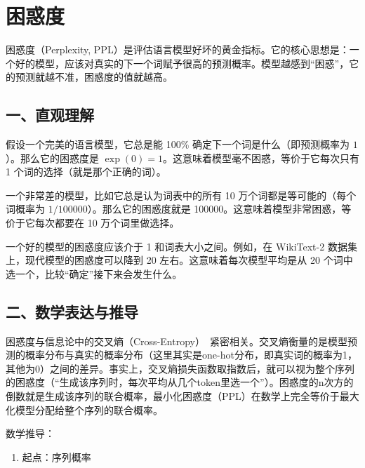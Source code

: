 \setcounter{section}{7}

\hypertarget{ux56f0ux60d1ux5ea6}{%
\section{困惑度}\label{ux56f0ux60d1ux5ea6}}

困惑度（Perplexity, PPL）是评估语言模型好坏的黄金指标。它的核心思想是：一个好的模型，应该对真实的下一个词赋予很高的预测概率。模型越感到``困惑''，它的预测就越不准，困惑度的值就越高。

\hypertarget{ux4e00ux76f4ux89c2ux7406ux89e3}{%
\subsection{一、直观理解}\label{ux4e00ux76f4ux89c2ux7406ux89e3}}

假设一个完美的语言模型，它总是能 100\% 确定下一个词是什么（即预测概率为 \(1\)）。那么它的困惑度是 \(\exp(0)=1\)。这意味着模型毫不困惑，等价于它每次只有 1 个词的选择（就是那个正确的词）。

一个非常差的模型，比如它总是认为词表中的所有 10 万个词都是等可能的（每个词概率为 \(1/100000\)）。那么它的困惑度就是 100000。这意味着模型非常困惑，等价于它每次都要在 10 万个词里做选择。

一个好的模型的困惑度应该介于 1 和词表大小之间。例如，在 WikiText-2 数据集上，现代模型的困惑度可以降到 20 左右。这意味着每次模型平均是从 20 个词中选一个，比较``确定''接下来会发生什么。

\hypertarget{ux4e8cux6570ux5b66ux8868ux8fbeux4e0eux63a8ux5bfc}{%
\subsection{二、数学表达与推导}\label{ux4e8cux6570ux5b66ux8868ux8fbeux4e0eux63a8ux5bfc}}

困惑度与信息论中的交叉熵（Cross-Entropy）~紧密相关。交叉熵衡量的是模型预测的概率分布与真实的概率分布（这里其实是one-hot分布，即真实词的概率为1，其他为0）之间的差异。事实上，交叉熵损失函数取指数后，就可以视为整个序列的困惑度（``生成该序列时，每次平均从几个token里选一个''）。困惑度的n次方的倒数就是生成该序列的联合概率，最小化困惑度（PPL）在数学上完全等价于最大化模型分配给整个序列的联合概率。

数学推导：

\begin{enumerate}
\def\labelenumi{\arabic{enumi}.}
\tightlist
\item
  起点：序列概率
\end{enumerate}

